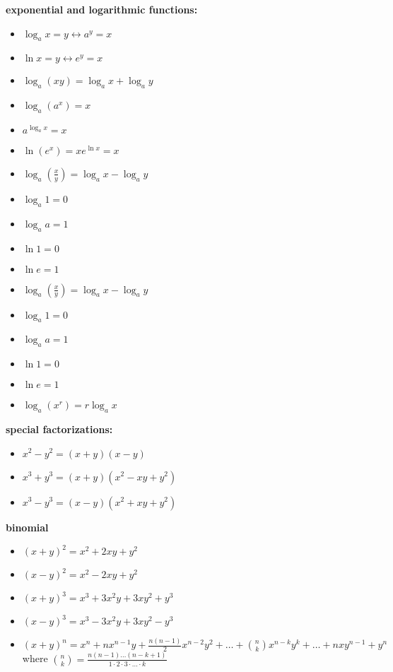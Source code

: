 \documentclass{article}
\begin{document}
\textbf{exponential and logarithmic functions:}
	\begin{itemize}
		\item $\log_ax = y \leftrightarrow a^y = x$
		\item $\ln x = y \leftrightarrow e^y = x$
		\item $\log_a(xy) = \log_ax + \log_ay$
		\item $\log_a(a^x) = x$
		\item $a^{\log_a x} = x$
		\item $\ln(e^x) = x e^{\ln x} = x$
		\item $\log_a(\frac{x}{y}) = \log_ax - \log_ay$
		\item $\log_a1 = 0$
		\item $\log_aa = 1$
		\item $\ln1 = 0$
		\item $\ln e = 1$
		\item $\log_a(\frac{x}{y}) = \log_ax - \log_ay$
		\item $\log_a1 = 0$
		\item $\log_aa = 1$
		\item $\ln1 = 0$
		\item $\ln e = 1$
		\item $\log_a(x^r) = r\log_ax$
	\end{itemize}

\textbf{special factorizations:}
	\begin{itemize}
		\item $x^2 - y^2 = (x + y)(x - y)$
		\item $x^3 + y^3 = (x + y)(x^2 - xy + y^2)$
		\item $x^3 - y^3 = (x - y)(x^2 + xy + y^2)$
	\end{itemize}

\textbf{binomial}
	\begin{itemize}
		\item $(x + y)^2 = x^2 + 2xy + y^2$
		\item $(x - y)^2 = x^2 - 2xy + y^2$
		\item $(x + y)^3 = x^3 + 3x^2y + 3xy^2 + y^3$
		\item $(x - y)^3 = x^3 - 3x^2y + 3xy^2 - y^3$
		\item $(x + y)^n = x^n + nx^{n-1}y + \frac{n(n-1)}{2}x^{n-2}y^2 + \ldots + \binom{n}{k}x^{n-k}y^k + \dots + nxy^{n-1} + y^n$
			where $\binom{n}{k} = \frac{n(n-1) \dots (n-k+1)}{1 \cdot 2 \cdot 3 \cdot \ldots \cdot k}$
	\end{itemize}
\end{document}
